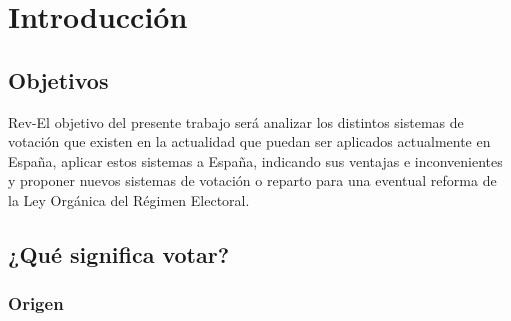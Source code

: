 \documentclass[12pt,a4paper,]{book}
\def\ifdoblecara{} %
\def\ifprincipal{} %
\numberwithin{dummy}{section}
\theoremstyle{ocrenumbox}
\theoremstyle{blacknumex}
\theoremstyle{blacknumbox}
\theoremstyle{ocrenum}
\theoremstyle{ocrenum}
\begin{document}
\cleardoublepage


\ifdefined\ifdoblecara
\fancyhead[LE,RO]{\scriptsize\rightmark}
\fancyfoot[LO,RE]{\scriptsize\slshape \leftmark}
\fancyfoot[C]{}
\fancyfoot[LE,RO]{\footnotesize\thepage}
\else
\fancyhead[RO]{\scriptsize\rightmark}
\fancyfoot[LO]{\scriptsize\slshape \leftmark}
\fancyfoot[C]{}
\fancyfoot[RO]{\footnotesize\thepage}
\fi

\renewcommand{\headrulewidth}{0.4pt}
\renewcommand{\footrulewidth}{0.4pt}

\ifdefined\ifprincipal
\else
\setlength{\parindent}{1em}
\pagestyle{fancy}
\setcounter{tocdepth}{4}
\tableofcontents

\fi

\ifdefined\ifdoblecara
\fancyhead{}{}
\fancyhead[LE,RO]{\scriptsize\rightmark}
\fancyfoot[LO,RE]{\scriptsize\slshape \leftmark}
\fancyfoot[C]{}
\fancyfoot[LE,RO]{\footnotesize\thepage}
\else
\fancyhead{}{}
\fancyhead[RO]{\scriptsize\rightmark}
\fancyfoot[LO]{\scriptsize\slshape \leftmark}
\fancyfoot[C]{}
\fancyfoot[RO]{\footnotesize\thepage}
\fi
\renewcommand{\headrulewidth}{0.4pt}
\renewcommand{\footrulewidth}{0.4pt}

\hypertarget{introducciuxf3n}{%
\chapter{Introducción}\label{introducciuxf3n}}

\hypertarget{objetivos}{%
\section{Objetivos}\label{objetivos}}

Rev-El objetivo del presente trabajo será analizar los distintos
sistemas de votación que existen en la actualidad que puedan ser
aplicados actualmente en España, aplicar estos sistemas a España,
indicando sus ventajas e inconvenientes y proponer nuevos sistemas de
votación o reparto para una eventual reforma de la Ley Orgánica del
Régimen Electoral.

\hypertarget{quuxe9-significa-votar}{%
\section{¿Qué significa votar?}\label{quuxe9-significa-votar}}

\hypertarget{origen}{%
\subsection{Origen}\label{origen}}
\end{document}
